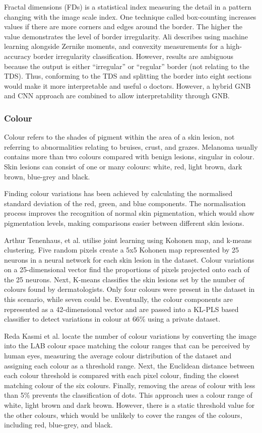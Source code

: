 Fractal dimensions (FDs) is a statistical index measuring the detail in a pattern changing with the image scale index. One technique called box-counting increases values if there are more corners and edges around the border. The higher the value demonstrates the level of border irregularity. Ali describes using machine learning alongside Zernike moments, and convexity measurements for a high-accuracy border irregularity classification\cite{Ali2020b}. However, results are ambiguous because the output is either ``irregular'' or ``regular'' border (not relating to the TDS). Thus, conforming to the TDS and splitting the border into eight sections would make it more interpretable and useful o doctors. However, a hybrid GNB and CNN approach are combined to allow interpretability through GNB.

\subsubsection{Colour}
Colour refers to the shades of pigment within the area of a skin lesion, not referring to abnormalities relating to bruises, crust, and grazes. Melanoma usually contains more than two colours compared with benign lesions, singular in colour. Skin lesions can consist of one or many colours: white, red, light brown, dark brown, blue-grey and black.

Finding colour variations has been achieved by calculating the normalised standard deviation of the red, green, and blue components\cite{She2007}. The normalisation process improves the recognition of normal skin pigmentation, which would show pigmentation levels, making comparisons easier between different skin lesions.

Arthur Tenenhaus, et al. utilise joint learning using Kohonen map, and k-means clustering\cite{Tenenhaus2010}. Five random pixels create a 5x5 Kohonen map represented by 25 neurons in a neural network for each skin lesion in the dataset. Colour variations on a 25-dimensional vector find the proportions of pixels projected onto each of the 25 neurons. Next, K-means classifies the skin lesions set by the number of colours found by dermatologists. Only four colours were present in the dataset in this scenario, while seven could be. Eventually, the colour components are represented as a 42-dimensional vector and are passed into a KL-PLS based classifier to detect variations in colour at 66\% using a private dataset.

Reda Kasmi et al. locate the number of colour variations by converting the image into the LAB colour space matching the colour ranges that can be perceived by human eyes\cite{Myridis2014a}, measuring the average colour distribution of the dataset and assigning each colour as a threshold range. Next, the Euclidean distance between each colour threshold is compared with each pixel colour\cite{Kasmi2016}, finding the closest matching colour of the six colours. Finally, removing the areas of colour with less than 5\% prevents the classification of dots. This approach uses a colour range of white, light brown and dark brown. However, there is a static threshold value for the other colours, which would be unlikely to cover the ranges of the colours, including red, blue-grey, and black.

